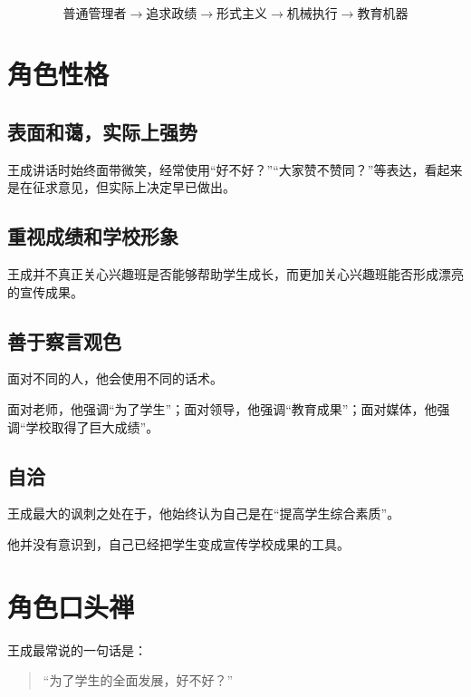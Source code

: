 \documentclass[12pt,a4paper]{ctexart}
\begin{document}
\[
    \text{普通管理者} \rightarrow \text{追求政绩} \rightarrow \text{形式主义}
    \rightarrow \text{机械执行} \rightarrow \text{教育机器}
\]

\section{角色性格}

\subsection{表面和蔼，实际上强势}

王成讲话时始终面带微笑，经常使用“好不好？”“大家赞不赞同？”等表达，看起来是在征求意见，但实际上决定早已做出。

\subsection{重视成绩和学校形象}

王成并不真正关心兴趣班是否能够帮助学生成长，而更加关心兴趣班能否形成漂亮的宣传成果。

\subsection{善于察言观色}

面对不同的人，他会使用不同的话术。

面对老师，他强调“为了学生”；面对领导，他强调“教育成果”；面对媒体，他强调“学校取得了巨大成绩”。

\subsection{自洽}

王成最大的讽刺之处在于，他始终认为自己是在“提高学生综合素质”。

他并没有意识到，自己已经把学生变成宣传学校成果的工具。

\section{角色口头禅}

王成最常说的一句话是：

\begin{quote}
    “为了学生的全面发展，好不好？”
\end{quote}
\end{document}
